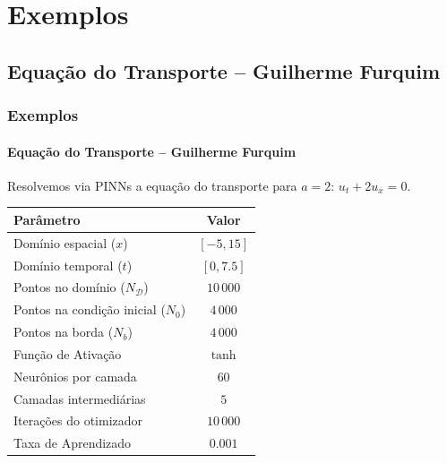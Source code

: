 \documentclass[usenames,dvipsnames,brazil,aspectratio=169]{beamer}
\begin{document}
\section{Exemplos}
\subsection*{Equação do Transporte -- Guilherme Furquim}

\begin{frame}[t]
    \frametitle{Exemplos}
    \framesubtitle{Equação do Transporte -- Guilherme Furquim}
    Resolvemos via PINNs a equação do transporte para $a=2$: $u_t + 2u_x = 0$.
    \begin{table}[H]
        \centering
        \begin{tabular}{|l|c|}
            \hline
            \textbf{Parâmetro} & \textbf{Valor} \\
            \hline
            Domínio espacial ($x$) & $[-5, 15]$ \\
            Domínio temporal ($t$) & $[0, 7.5]$ \\
            Pontos no domínio ($N_{\mathcal{D}}$) & $10\,000$ \\
            Pontos na condição inicial ($N_0$) & $4\,000$ \\
            Pontos na borda ($N_b$) & $4\,000$ \\
            Função de Ativação & $\tanh$ \\
            Neurônios por camada & $60$ \\
            Camadas intermediárias & $5$ \\
            Iterações do otimizador & $10\,000$ \\
            Taxa de Aprendizado & $0.001$ \\
            \hline
        \end{tabular}
    \end{table}
\end{frame}

\end{document}
